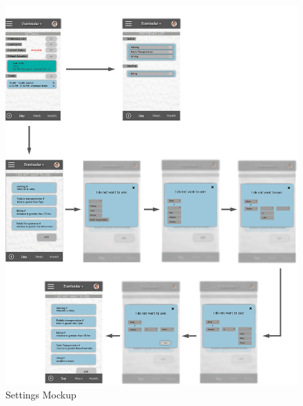 \begin{figure}[h]
\centering\includegraphics[width = \textwidth, scale = 0.3]{Images/Mockups/Settings+.png}{}
\caption{Settings Mockup}
\end{figure}
\clearpage